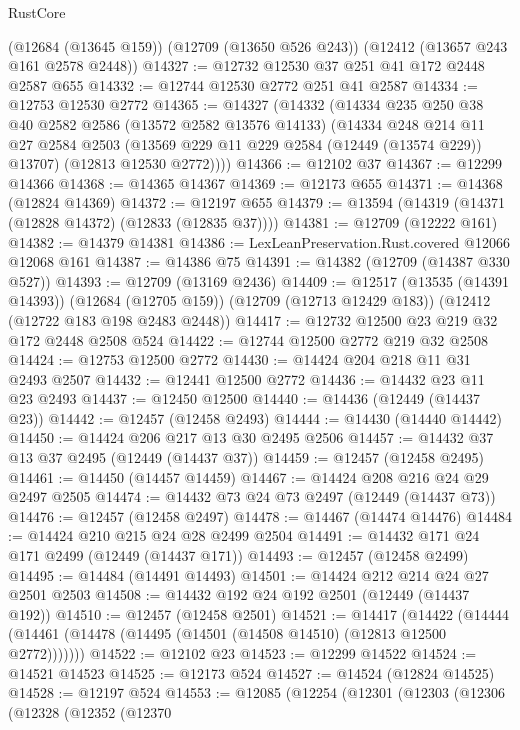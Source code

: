 \begin{lexlean}{RustCore}
\begin{coremodule}
    (@12684 (@13645 @159))
    (@12709 (@13650 @526 @243))
    (@12412 (@13657 @243 @161 @2578 @2448))
@14327 := @12732 @12530 @37 @251 @41 @172 @2448 @2587 @655
@14332 := @12744 @12530 @2772 @251 @41 @2587
@14334 := @12753 @12530 @2772
@14365 := @14327
    (@14332
      (@14334
        @235
        @250
        @38
        @40
        @2582
        @2586
        (@13572 @2582 @13576 @14133)
        (@14334
          @248
          @214
          @11
          @27
          @2584
          @2503
          (@13569 @229 @11 @229 @2584 (@12449 (@13574 @229)) @13707)
          (@12813 @12530 @2772))))
@14366 := @12102 @37
@14367 := @12299 @14366
@14368 := @14365 @14367
@14369 := @12173 @655
@14371 := @14368 (@12824 @14369)
@14372 := @12197 @655
@14379 := @13594 (@14319 (@14371 (@12828 @14372) (@12833 (@12835 @37))))
@14381 := @12709 (@12222 @161)
@14382 := @14379 @14381
@14386 := LexLeanPreservation.Rust.covered @12066 @12068 @161
@14387 := @14386 @75
@14391 := @14382 (@12709 (@14387 @330 @527))
@14393 := @12709 (@13169 @2436)
@14409 := @12517
    (@13535 (@14391 @14393))
    (@12684 (@12705 @159))
    (@12709 (@12713 @12429 @183))
    (@12412 (@12722 @183 @198 @2483 @2448))
@14417 := @12732 @12500 @23 @219 @32 @172 @2448 @2508 @524
@14422 := @12744 @12500 @2772 @219 @32 @2508
@14424 := @12753 @12500 @2772
@14430 := @14424 @204 @218 @11 @31 @2493 @2507
@14432 := @12441 @12500 @2772
@14436 := @14432 @23 @11 @23 @2493
@14437 := @12450 @12500
@14440 := @14436 (@12449 (@14437 @23))
@14442 := @12457 (@12458 @2493)
@14444 := @14430 (@14440 @14442)
@14450 := @14424 @206 @217 @13 @30 @2495 @2506
@14457 := @14432 @37 @13 @37 @2495 (@12449 (@14437 @37))
@14459 := @12457 (@12458 @2495)
@14461 := @14450 (@14457 @14459)
@14467 := @14424 @208 @216 @24 @29 @2497 @2505
@14474 := @14432 @73 @24 @73 @2497 (@12449 (@14437 @73))
@14476 := @12457 (@12458 @2497)
@14478 := @14467 (@14474 @14476)
@14484 := @14424 @210 @215 @24 @28 @2499 @2504
@14491 := @14432 @171 @24 @171 @2499 (@12449 (@14437 @171))
@14493 := @12457 (@12458 @2499)
@14495 := @14484 (@14491 @14493)
@14501 := @14424 @212 @214 @24 @27 @2501 @2503
@14508 := @14432 @192 @24 @192 @2501 (@12449 (@14437 @192))
@14510 := @12457 (@12458 @2501)
@14521 := @14417
    (@14422 (@14444 (@14461 (@14478 (@14495 (@14501 (@14508 @14510) (@12813 @12500 @2772)))))))
@14522 := @12102 @23
@14523 := @12299 @14522
@14524 := @14521 @14523
@14525 := @12173 @524
@14527 := @14524 (@12824 @14525)
@14528 := @12197 @524
@14553 := @12085
    (@12254
      (@12301
        (@12303
          (@12306
            (@12328
              (@12352
                (@12370

\end{coremodule}
\end{lexlean}
